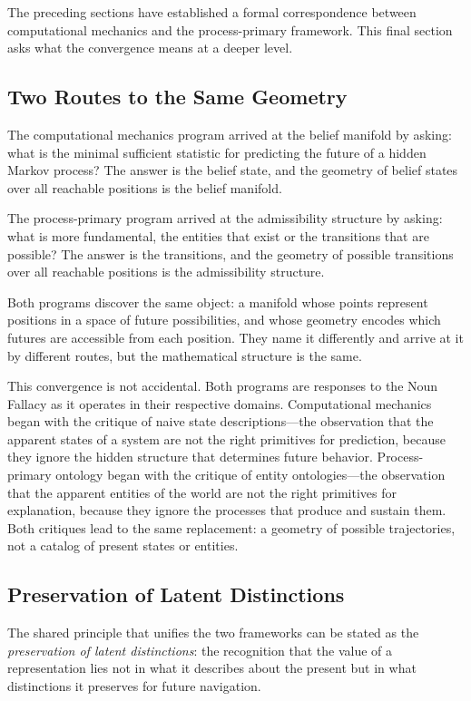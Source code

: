 \documentclass[12pt, a4paper]{article}
\theoremstyle{plain}
\theoremstyle{definition}
\theoremstyle{remark}
\begin{document}
\noindent
The preceding sections have established a formal correspondence between
computational mechanics and the process-primary framework. This final
section asks what the convergence means at a deeper level.

\subsection{Two Routes to the Same Geometry}

The computational mechanics program arrived at the belief manifold by
asking: what is the minimal sufficient statistic for predicting the
future of a hidden Markov process? The answer is the belief state, and
the geometry of belief states over all reachable positions is the belief
manifold.

The process-primary program arrived at the admissibility structure by
asking: what is more fundamental, the entities that exist or the
transitions that are possible? The answer is the transitions, and the
geometry of possible transitions over all reachable positions is the
admissibility structure.

Both programs discover the same object: a manifold whose points represent
positions in a space of future possibilities, and whose geometry encodes
which futures are accessible from each position. They name it differently
and arrive at it by different routes, but the mathematical structure is
the same.

This convergence is not accidental. Both programs are responses to the
Noun Fallacy as it operates in their respective domains. Computational
mechanics began with the critique of naive state descriptions---the
observation that the apparent states of a system are not the right
primitives for prediction, because they ignore the hidden structure that
determines future behavior. Process-primary ontology began with the
critique of entity ontologies---the observation that the apparent entities
of the world are not the right primitives for explanation, because they
ignore the processes that produce and sustain them. Both critiques lead
to the same replacement: a geometry of possible trajectories, not a
catalog of present states or entities.

\subsection{Preservation of Latent Distinctions}

The shared principle that unifies the two frameworks can be stated as
the \emph{preservation of latent distinctions}: the recognition that
the value of a representation lies not in what it describes about the
present but in what distinctions it preserves for future navigation.
\end{document}

